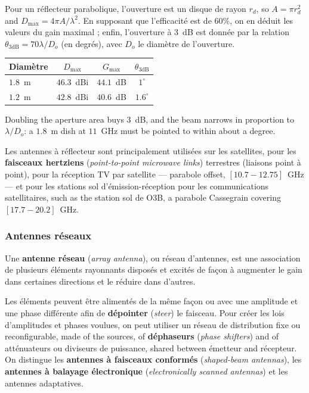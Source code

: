 \begin{example}
  Pour un réflecteur parabolique, l'ouverture est un disque de rayon $r_d$,
  so $A = \pi r_d^2$ and $D_{\max} = 4\pi A/\lambda^2$. En supposant que
  l'efficacité est de $60\%$, on en déduit les valeurs du gain maximal ;
  enfin, l'ouverture à 3~dB est donnée par la relation
  $\theta_{3\mathrm{dB}} = 70 \lambda / D_o$ (en degrés), avec $D_o$ le
  diamètre de l'ouverture.
  \begin{center}
    \begin{tabular}{@{}lccc@{}}
      \toprule
      Diamètre & $D_{\max}$ & $G_{\max}$ & $\theta_{3\mathrm{dB}}$ \\
      \midrule
      $1.8$~m & $46.3$~dBi & $44.1$~dB & $1^\circ$ \\
      $1.2$~m & $42.8$~dBi & $40.6$~dB & $1.6^\circ$ \\
      \bottomrule
    \end{tabular}
  \end{center}
  Doubling the aperture area buys $3$~dB, and the beam narrows in proportion to
  $\lambda/D_o$: a $1.8$~m dish at $11$~GHz must be pointed to within about a
  degree.
\end{example}

Les antennes à réflecteur sont principalement utilisées sur les satellites,
pour les \textbf{faisceaux hertziens} (\textit{point-to-point microwave links})
terrestres (liaisons point à point), pour la réception TV par satellite ---
parabole offset, $[10.7 - 12.75]$~GHz --- et pour les stations sol
d'émission-réception pour les communications satellitaires, such as the
station sol de O3B, a parabole Cassegrain covering $[17.7 - 20.2]$~GHz.

\subsubsection{Antennes réseaux}

\begin{definition}
  Une \textbf{antenne réseau} (\textit{array antenna}), ou réseau d'antennes,
  est une association de plusieurs éléments rayonnants disposés et excités de
  façon à augmenter le gain dans certaines directions et le réduire dans
  d'autres.
\end{definition}

Les éléments peuvent être alimentés de la même façon ou avec une amplitude et
une phase différente afin de \textbf{dépointer} (\textit{steer}) le faisceau.
Pour créer les lois d'amplitudes et phases voulues, on peut utiliser un réseau
de distribution fixe ou reconfigurable, made of the sources, of
\textbf{déphaseurs} (\textit{phase shifters}) and of atténuateurs ou diviseurs
de puissance, shared between émetteur and récepteur. On distingue les
\textbf{antennes à faisceaux conformés} (\textit{shaped-beam antennas}), les
\textbf{antennes à balayage électronique}
(\textit{electronically scanned antennas}) et les antennes adaptatives.\\

